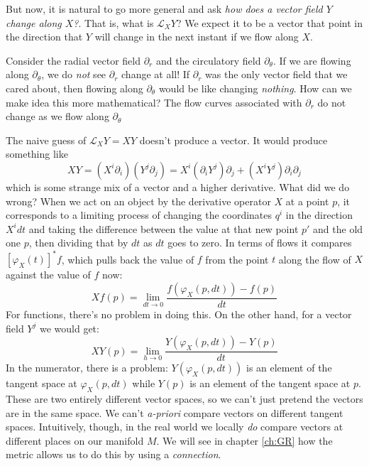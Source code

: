 \documentclass[../master.tex]{subfiles}
\begin{document}
		
		But now, it is natural to go more general and ask \emph{how does a vector field $Y$ change along $X$?}. That is, what is $\mathcal L_X Y$? We expect it to be a vector that point in the direction that $Y$ will change in the next instant if we flow along $X$. 
		
		Consider the radial vector field $\partial_r$ and the circulatory field $\partial_\theta$. If we are flowing along $\partial_\theta$, we do \emph{not} see $\partial_r$ change at all! If $\partial_r$ was the only vector field that we cared about, then flowing along $\partial_\theta$ would be like changing \emph{nothing}. How can we make idea this more mathematical? The flow curves associated with $\partial_r$ do not change as we flow along $\partial_\theta$
		
		
		The naive guess of $\mathcal L_X Y = XY$ doesn't produce a vector. It would produce something like 
		\begin{equation}
			XY = (X^i \partial_i) (Y^j \partial_j) = X^i (\partial_i Y^j) \partial_j + (X^i Y^j) \partial_i \partial_j
		\end{equation}
		which is some strange mix of a vector and a higher derivative. What did we do wrong? When we act on an object by the derivative operator $X$ at a point $p$, it corresponds to a limiting process of changing the coordinates $q^i$ in the direction $X^i dt$ and taking the difference between the value at that new point $p'$ and the old one $p$, then dividing that by $dt$ as $dt$ goes to zero. In terms of flows it compares $[\varphi_X(t)]^* f$, which pulls back the value of $f$ from the point $t$ along the flow of $X$ against the value of $f$ now: 
		\begin{equation}
			Xf(p) = \lim_{dt \rightarrow 0} \frac{f(\varphi_X (p,dt)) - f(p)}{dt}
		\end{equation}
		For functions, there's no problem in doing this. On the other hand, for a vector field $Y^j$ we would get:
		\begin{equation}
			XY(p) = \lim_{h \rightarrow 0} \frac{Y(\varphi_X (p,dt)) - Y(p)}{dt}
		\end{equation}
		In the numerator, there is a problem: $Y(\varphi_X (p,dt))$ is an element of the tangent space at $\varphi_X (p,dt)$ while $Y(p)$ is an element of the tangent space at $p$. These are two entirely different vector spaces, so we can't just pretend the vectors are in the same space. We can't \emph{a-priori} compare vectors on different tangent spaces. Intuitively, though, in the real world we locally \emph{do} compare vectors at different places on our manifold $M$. We will see in chapter \ref{ch:GR} how the metric allows us to do this by using a \emph{connection}.  
		
\end{document}
